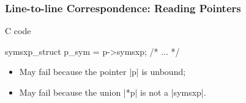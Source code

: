 \documentclass{beamer}
\begin{document}
\begin{frame}[fragile]
    \label{frame:reading:pointers}
    \frametitle{Line-to-line Correspondence: Reading Pointers}

    \begin{changemargin}{-5mm}{-5mm}

\begin{minipage}{.6\textwidth}
    {C code}
\begin{ccode}
symsxp_struct p_sym = p->symsxp;
/* ... */
\end{ccode}
\end{minipage}
    \begin{minipage}{.45\textwidth}
    \begin{itemize}
        \item May fail because the pointer \cinline|p| is unbound;
        \item May fail because the union \cinline|*p| is not a \cinline|symsxp|.
    \end{itemize}
    \end{minipage}

\vfill


\end{changemargin}
\end{frame}
\end{document}
